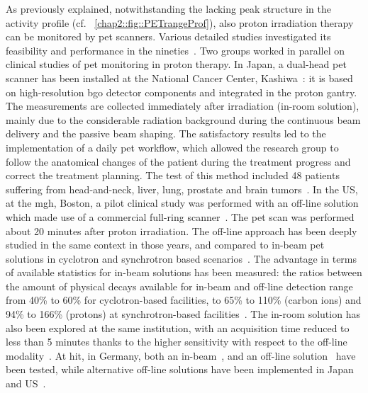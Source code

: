 As previously explained, notwithstanding the lacking peak structure in the activity profile (cf. \figurename~\ref{chap2::fig::PETrangeProf}), also proton irradiation therapy can be monitored by \gls{pet} scanners. Various detailed studies investigated its feasibility and performance in the nineties~\parencite{Litzenberg1992, Paans1993, Oelfke1996, Litzenberg1999}. Two groups worked in parallel on clinical studies of \gls{pet} monitoring in proton therapy. In Japan, a dual-head \gls{pet} scanner has been installed at the National Cancer Center, Kashiwa~\parencite{Nishio2006}: it is based on high-resolution \gls{bgo} detector components and integrated in the proton gantry. The measurements are collected immediately after irradiation (in-room solution), mainly due to the considerable radiation background during the continuous beam delivery and the passive beam shaping. The satisfactory results led to the implementation of a daily \gls{pet} workflow, which allowed the research group to follow the anatomical changes of the patient during the treatment progress and correct the treatment planning. The test of this method included 48 patients suffering from head-and-neck, liver, lung, prostate and brain tumors~\parencite{Nishio2010}. In the US, at the \gls{mgh}, Boston, a pilot clinical study was performed with an off-line solution which made use of a commercial full-ring scanner~\parencite{Parodi2007}. The \gls{pet} scan was performed about 20 minutes after proton irradiation. The off-line approach has been deeply studied in the same context in those years, and compared to in-beam \gls{pet} solutions in cyclotron and synchrotron based scenarios~\parencite{Parodi2008, Knopf2011}. The advantage in terms of available statistics for in-beam solutions has been measured: the ratios between the amount of physical decays available for in-beam and off-line detection range from 40\% to 60\% for cyclotron-based facilities, to 65\% to 110\% (carbon ions) and 94\% to 166\% (protons) at synchrotron-based facilities~\parencite{Parodi2008}. The in-room solution has also been explored at the same institution, with an acquisition time reduced to less than 5 minutes thanks to the higher sensitivity with respect to the off-line modality~\parencite{Zhu2011}.  
At \gls{hit}, in Germany, both an in-beam~\parencite{Sommerer2009}, and an off-line solution~\parencite{Bauer2013} have been tested, while alternative off-line solutions have been implemented in Japan~\parencite{Hishikawa2002} and US~\parencite{Hsi2009}. 
